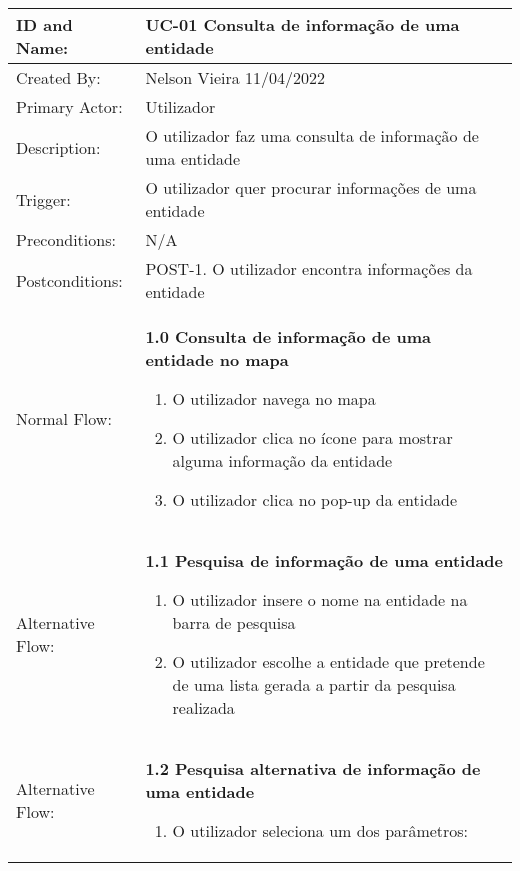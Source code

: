 \documentclass{scrreprt}
\begin{document}
\begin{table}[H]
    \centering
    \begin{adjustbox}{width=1.2\textwidth,center=\textwidth}
        \begin{tabular}{|m{4cm}|m{12cm}|}
            \hline
            ID and Name: & UC-01 Consulta de informação de uma entidade \\
            \hline
            Created By: & Nelson Vieira 11/04/2022 \\
            \hline
            Primary Actor: & Utilizador \\
            \hline
            Description: & O utilizador faz uma consulta de informação de uma entidade \\
            \hline
            Trigger: & O utilizador quer procurar informações de uma entidade \\
            \hline
            Preconditions: & N/A \\
            \hline
            Postconditions: & POST-1. O utilizador encontra informações da entidade \\
            \hline
            Normal Flow: & \textbf{1.0 Consulta de informação de uma entidade no mapa}
            \begin{enumerate}
                \item O utilizador navega no mapa
                \item O utilizador clica no ícone para mostrar alguma informação da entidade
                \item O utilizador clica no pop-up da entidade
            \end{enumerate} \\
            \hline
            Alternative Flow: & \textbf{1.1 Pesquisa de informação de uma entidade}
            \begin{enumerate}
                \item O utilizador insere o nome na entidade na barra de pesquisa
                \item O utilizador escolhe a entidade que pretende de uma lista gerada a partir da pesquisa realizada
            \end{enumerate} \\
            \hline
            Alternative Flow: & \textbf{1.2 Pesquisa alternativa de informação de uma entidade}
            \begin{enumerate}
                \item O utilizador seleciona um dos parâmetros:

\end{enumerate}
\end{tabular}
\end{adjustbox}
\end{table}
\end{document}
